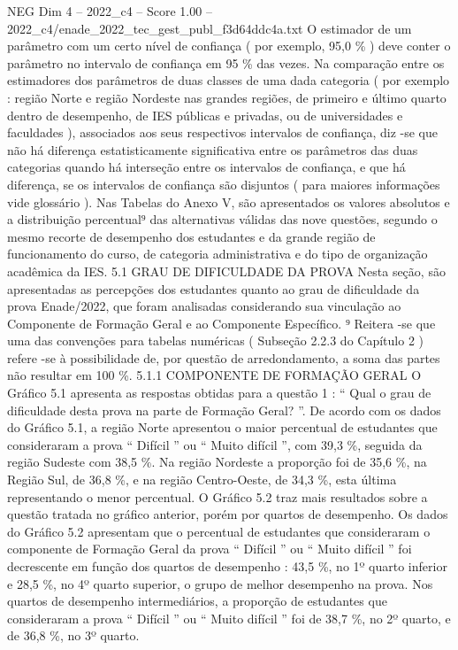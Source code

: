 \begin{textsample}{NEG Dim 4 – 2022\_c4 – Score 1.00 – 2022\_c4/enade\_2022\_tec\_gest\_publ\_f3d64ddc4a.txt}
O estimador de um parâmetro com um certo nível de confiança ( por exemplo, 95,0 \% ) deve conter o parâmetro no intervalo de confiança em 95 \% das vezes.
Na comparação entre os estimadores dos parâmetros de duas classes de uma dada categoria ( por exemplo : região Norte e região Nordeste nas grandes regiões, de primeiro e último quarto dentro de desempenho, de IES públicas e privadas, ou de universidades e faculdades ), associados aos seus respectivos intervalos de confiança, diz -se que não há diferença estatisticamente significativa entre os parâmetros das duas categorias quando há interseção entre os intervalos de confiança, e que há diferença, se os intervalos de confiança são disjuntos ( para maiores informações vide glossário ).
Nas Tabelas do Anexo V, são apresentados os valores absolutos e a distribuição percentual⁹ das alternativas válidas das nove questões, segundo o mesmo recorte de desempenho dos estudantes e da grande região de funcionamento do curso, de categoria administrativa e do tipo de organização acadêmica da IES. 5.1 GRAU DE DIFICULDADE DA PROVA Nesta seção, são apresentadas as percepções dos estudantes quanto ao grau de dificuldade da prova Enade/2022, que foram analisadas considerando sua vinculação ao Componente de Formação Geral e ao Componente Específico. ⁹ Reitera -se que uma das convenções para tabelas numéricas ( Subseção 2.2.3 do Capítulo 2 ) refere -se à possibilidade de, por questão de arredondamento, a soma das partes não resultar em 100 \%. 5.1.1 COMPONENTE DE FORMAÇÃO GERAL O Gráfico 5.1 apresenta as respostas obtidas para a questão 1 : “ Qual o grau de dificuldade desta prova na parte de Formação Geral? ”.
De acordo com os dados do Gráfico 5.1, a região Norte apresentou o maior percentual de estudantes que consideraram a prova “ Difícil ” ou “ Muito difícil ”, com 39,3 \%, seguida da região Sudeste com 38,5 \%.
Na região Nordeste a proporção foi de 35,6 \%, na Região Sul, de 36,8 \%, e na região Centro-Oeste, de 34,3 \%, esta última representando o menor percentual.
O Gráfico 5.2 traz mais resultados sobre a questão tratada no gráfico anterior, porém por quartos de desempenho.
Os dados do Gráfico 5.2 apresentam que o percentual de estudantes que consideraram o componente de Formação Geral da prova “ Difícil ” ou “ Muito difícil ” foi decrescente em função dos quartos de desempenho : 43,5 \%, no 1º quarto inferior e 28,5 \%, no 4º quarto superior, o grupo de melhor desempenho na prova.
Nos quartos de desempenho intermediários, a proporção de estudantes que consideraram a prova “ Difícil ” ou “ Muito difícil ” foi de 38,7 \%, no 2º quarto, e de 36,8 \%, no 3º quarto.

\end{textsample}
